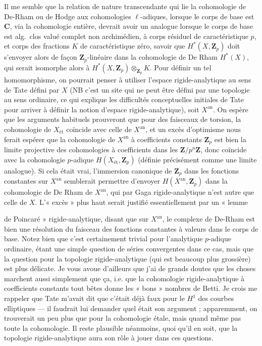 \documentclass[11pt,a4paper]{article}
\begin{document}
Il me semble que la relation de nature transcendante qui lie la cohomologie
de De-Rham ou de Hodge aux cohomologies $\ell$-adiques, lorsque le corps de
base est $\mathbf{C}$, via la cohomologie entière, devrait avoir un analogue
lorsque le corps de base est alg.\ clos 
valué complet non archimédien, à corps résiduel de caractéristique $p$, et
corps des fractions $K$  de caractéristique
zéro, savoir que $H^{*}(X, \mathbf{Z}_p)$ doit s'envoyer alors de façon
$\mathbf{Z}_p$-linéaire dans la cohomologie de De Rham $H^{*}(X)$, qui serait
isomorphe alors à $H^{*}(X, \mathbf{Z}_p) \otimes_{\mathbf{Z}_p} K$. Pour
définir un tel homomorphisme, on pourrait penser à utiliser l'espace
rigide-analytique au sens de Tate défini par $X$ (NB c'est un site qui ne
peut être défini par une topologie au sens ordinaire, ce qui explique les
difficultés conceptuelles initiales de Tate pour arriver à définir la notion
d'espace rigide-analytique), soit $X^{\mathrm{an}}$. On espère que les
arguments habituels prouveront que pour des faisceaux de torsion, la
cohomologie de $X_{\text{ét}}$ coïncide avec celle de $X^{\mathrm{an}}$, et
un excès d'optimisme nous ferait espérer que la cohomologie de
$X^{\mathrm{an}}$ à coefficients constants $\mathbf{Z}_p$ est bien la limite
projective des cohomologies à coefficients dans les $\mathbf{Z}/p^n\mathbf{Z}$,
donc coïncide avec la cohomologie $p$-adique $H(X_{\text{ét}}, \mathbf{Z}_p)$
(définie précisément comme une limite analogue). Si cela était vrai,
l'immersion canonique de $\mathbf{Z}_p$ dans les fonctions constantes sur
$X^{\mathrm{an}}$ semblerait permettre d'envoyer $H(X^{\mathrm{an}},
\mathbf{Z}_p)$ dans la cohomologie de De Rham de $X^{\mathrm{an}}$, qui par
Gaga rigide-analytique n'est autre que celle de $X$. L'« excès » plus haut
serait justifié essentiellement par un « lemme


de Poincaré » rigide-analytique, disant que sur $X^{\mathrm{an}}$, le
complexe de De-Rham est bien une résolution du faisceau des fonctions
constantes à valeurs dans le corps de base. Notez bien que c'est certainement
trivial pour l'analytique $p$-adique ordinaire, étant une simple question de
séries convergentes dans ce cas, mais que la question pour la
topologie rigide-analytique (qui est beaucoup plus grossière) est plus
délicate. Je vous avoue d'ailleurs que j'ai de grands doutes que les choses
marchent aussi simplement que ça, i.e. que la cohomologie rigide-analytique
à coefficients constants tout bêtes donne les « bons » nombres de Betti. Je
crois me rappeler que Tate m'avait dit que c'était déjà faux pour le $H^1$
des courbes elliptiques --- il faudrait lui demander quel était son
argument ; apparemment, on trouverait un peu plus que pour la cohomologie
étale, mais quand même pas toute la cohomologie. Il reste plausible
néanmoins, quoi qu'il en soit, que la topologie rigide-analytique aura son
rôle à jouer dans ces questions.
\end{document}
